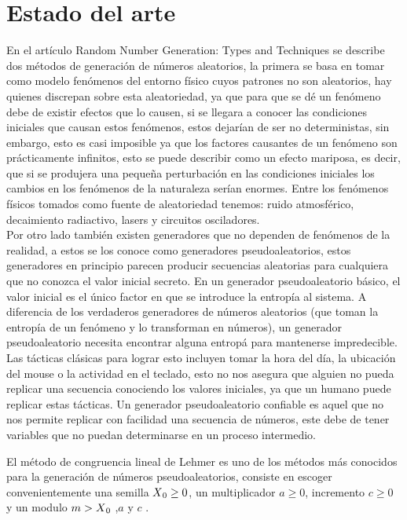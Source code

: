 \documentclass[conference]{IEEEtran}
\begin{document}
\section{\textbf{Estado del arte}}
En el art\'iculo Random Number Generation: Types and Techniques \cite{b1} se describe dos m\'etodos de generaci\'on de n\'umeros aleatorios, la primera se basa en tomar como modelo fen\'omenos del entorno f\'isico cuyos patrones no son aleatorios, hay quienes discrepan sobre esta aleatoriedad, ya que para que se d\'e un fen\'omeno debe de existir efectos que lo causen, si se llegara a conocer las condiciones iniciales que causan estos fen\'omenos, estos dejar\'ian de ser no deterministas, sin embargo, esto es casi imposible ya que los factores causantes de un fen\'omeno son pr\'acticamente infinitos, esto se puede describir como un efecto mariposa, es decir, que si se produjera una peque\~na perturbaci\'on en las condiciones iniciales los cambios en los fen\'omenos de la naturaleza ser\'ian enormes. Entre los fen\'omenos f\'isicos tomados como fuente de aleatoriedad tenemos: ruido atmosf\'erico, decaimiento radiactivo, lasers y circuitos osciladores.\\
Por otro lado tambi\'en existen generadores que no dependen de fen\'omenos de la realidad, a estos se los conoce como generadores pseudoaleatorios, estos generadores en principio parecen producir secuencias aleatorias para cualquiera que no conozca el valor inicial secreto. En un generador pseudoaleatorio b\'asico, el valor inicial es el \'unico factor en que se introduce la entrop\'ia al sistema. A diferencia de los verdaderos generadores de n\'umeros aleatorios (que toman la entrop\'ia de un fen\'omeno y lo transforman en n\'umeros), un generador pseudoaleatorio necesita encontrar alguna entrop\'a para mantenerse impredecible. Las t\'acticas cl\'asicas para lograr esto incluyen tomar la hora del d\'ia, la ubicaci\'on del mouse o la actividad en el teclado, esto no nos asegura que alguien no pueda replicar una secuencia conociendo los valores iniciales, ya que un humano puede replicar estas t\'acticas. Un generador pseudoaleatorio confiable es aquel que no nos permite replicar con facilidad una secuencia de n\'umeros, este debe de tener variables que no puedan determinarse en un proceso intermedio.

El m\'etodo de congruencia lineal de Lehmer es uno de los m\'etodos m\'as conocidos para la generaci\'on de n\'umeros pseudoaleatorios, consiste en escoger convenientemente una semilla $X\textsubscript{0}\geq 0$, un multiplicador $a \geq 0$, incremento $c \geq 0$ y un modulo $m >X\textsubscript{0}$ ,$a$ y $c$ .
\end{document}
